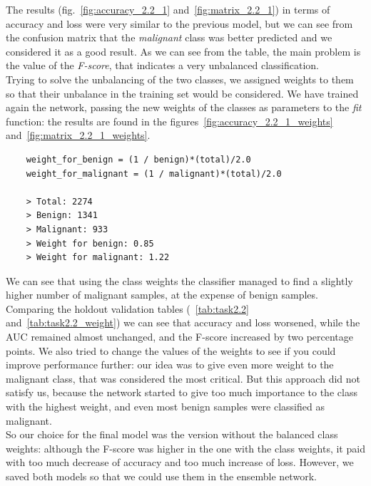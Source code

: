 \documentclass[11pt,a4paper,oneside]{article}
\begin{document}
The results (fig.~\ref{fig:accuracy_2.2_1} and~\ref{fig:matrix_2.2_1}) in terms of accuracy and loss were very similar to the previous model, but we can see from the confusion matrix that the \textit{malignant} class was better predicted and we considered it as a good result.
As we can see from the table, the main problem is the value of the \textit{F-score}, that indicates a very unbalanced classification.\\

Trying to solve the unbalancing of the two classes, we assigned weights to them so that their unbalance in the training set would be considered. We have trained again the network, passing the new weights of the classes as parameters to the \textit{fit} function: the results are found in the figures~\ref{fig:accuracy_2.2_1_weights} and~\ref{fig:matrix_2.2_1_weights}. 

\begin{verbatim}
    weight_for_benign = (1 / benign)*(total)/2.0 
    weight_for_malignant = (1 / malignant)*(total)/2.0
    
    > Total: 2274
    > Benign: 1341
    > Malignant: 933
    > Weight for benign: 0.85
    > Weight for malignant: 1.22
\end{verbatim}

\clearpage

We can see that using the class weights the classifier managed to find a slightly higher number of malignant samples, at the expense of benign samples. Comparing the holdout validation tables (~\ref{tab:task2.2} and~\ref{tab:task2.2_weight}) we can see that accuracy and loss worsened, while the AUC remained almost unchanged, and the F-score increased by two percentage points. 
We also tried to change the values of the weights to see if you could improve performance further: our idea was to give even more weight to the malignant class, that was considered the most critical. But this approach did not satisfy us, because the network started to give too much importance to the class with the highest weight, and even most benign samples were classified as malignant. \\

So our choice for the final model was the version without the balanced class weights: although the F-score was higher in the one with the class weights, it paid with too much decrease of accuracy and too much increase of loss. However, we saved both models so that we could use them in the ensemble network.
\end{document}
